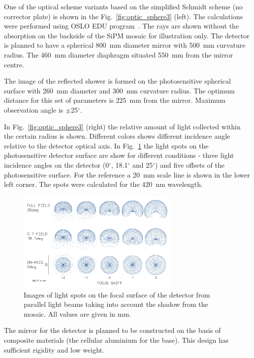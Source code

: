 \documentclass[a4paper,11pt]{article}
\begin{document}
One of the optical scheme variants based on the simplified Schmidt scheme (no corrector plate) is shown in the Fig.~\ref{fig:optic_sphere3} (left). The calculations were performed using OSLO EDU program~\cite{Oslo}. The rays are shown without the absorption on the backside of the SiPM mosaic for illustration only. The detector is planned to have a spherical 800~mm diameter mirror with 500~mm curvature radius. The 460~mm diameter diaphragm situated 550~mm from the mirror centre.

The image of the reflected shower is formed on the photosensitive spherical surface with 260~mm diameter and 300~mm curvature radius. The optimum distance for this set of parameters is 225~mm from the mirror. Maximum observation angle is $\pm$25$^\circ$.

In Fig.~\ref{fig:optic_sphere3} (right) the relative amount of light collected within the certain radius is shown. Different colors shows different incidence angle relative to the detector optical axis.
In Fig.~\ref{fig:spots} the light spots on the photosensitive detector surface are show for different conditions - three light incidence angles on the detector (0$^\circ$, 18.1$^\circ$ and 25$^\circ$) and five offsets of the photosensitive surface. For the reference a 20~mm scale line is shown in the lower left corner. The spots were calculated for the 420~nm wavelength.

\begin{figure}[bt]
\centering
\includegraphics[width=0.7\textwidth]{Sphere3spot.pdf}
\caption{Images of light spots on the focal surface of the detector from parallel light beams taking into account the shadow from the mosaic. All values are given in mm.}
\label{fig:spots}
\end{figure}    

The mirror for the detector is planned to be constructed on the basis of composite materials (the cellular aluminium for the base). This design has sufficient rigidity and low weight.
\end{document}
